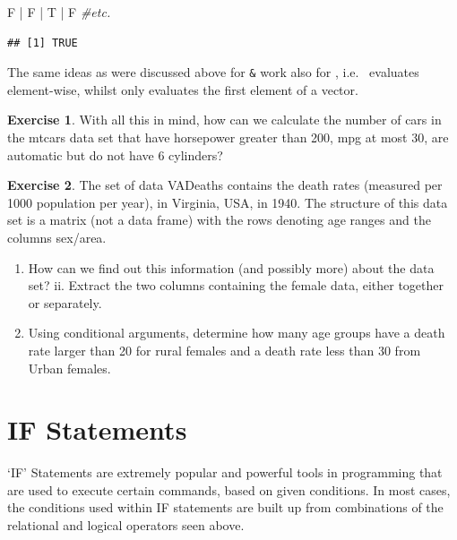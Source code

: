 \documentclass[
]{book}
\newenvironment{Shaded}{\begin{snugshade}}{\end{snugshade}}
\newcommand{\CommentTok}[1]{\textcolor[rgb]{0.56,0.35,0.01}{\textit{#1}}}
\newcommand{\NormalTok}[1]{#1}
\newcommand{\SpecialCharTok}[1]{\textcolor[rgb]{0.00,0.00,0.00}{#1}}
\providecommand{\tightlist}{%
  \setlength{\itemsep}{0pt}\setlength{\parskip}{0pt}}
\theoremstyle{definition}
\theoremstyle{definition}
\theoremstyle{definition}
\newtheorem{exercise}{Exercise}[chapter]
\theoremstyle{definition}
\theoremstyle{remark}
\begin{document}
\begin{Shaded}
\begin{Highlighting}[]
\NormalTok{F }\SpecialCharTok{|}\NormalTok{ F }\SpecialCharTok{|}\NormalTok{ T }\SpecialCharTok{|}\NormalTok{ F }\CommentTok{\#etc.}
\end{Highlighting}
\end{Shaded}

\begin{verbatim}
## [1] TRUE
\end{verbatim}

The same ideas as were discussed above for \texttt{\&} work also for \texttt{\textbar{}}, i.e.~\texttt{\textbar{}} evaluates element-wise, whilst \texttt{\textbar{}\textbar{}} only evaluates the first element of a vector.

\begin{exercise}
With all this in mind, how can we calculate the number of cars in the mtcars data set that have horsepower greater than 200, mpg at most 30, are automatic but do not have 6 cylinders?
\end{exercise}

\begin{exercise}

The set of data VADeaths contains the death rates (measured per 1000 population per year), in Virginia, USA, in 1940. The structure of this data set is a matrix (not a data frame) with the rows denoting age ranges and the columns sex/area.

\begin{enumerate}
\def\labelenumi{\roman{enumi}.}
\tightlist
\item
  How can we find out this information (and possibly more) about the data set? ii. Extract the two columns containing the female data, either together or separately.
\item
  Using conditional arguments, determine how many age groups have a death rate larger than 20 for rural females and a death rate less than 30 from Urban females.
\end{enumerate}

\end{exercise}

\hypertarget{if-statements}{%
\section{IF Statements}\label{if-statements}}

`IF' Statements are extremely popular and powerful tools in programming that are used to execute certain commands, based on given conditions. In most cases, the conditions used within IF statements are built up from combinations of the relational and logical operators seen above.
\end{document}
